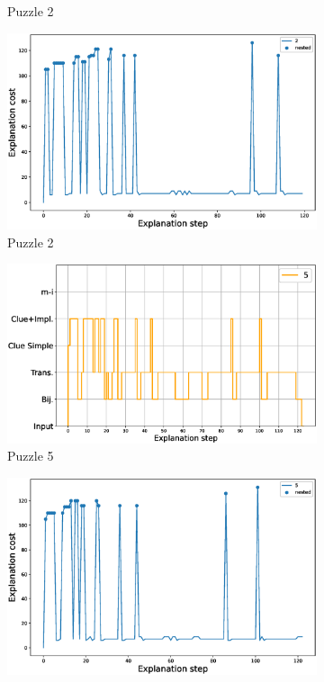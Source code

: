 \begin{figure}[t!]
\begin{subfigure}{.5\textwidth}
		\caption{Puzzle 2}
		\label{fig:composition_puzzle:p2}
	\end{subfigure}%
	\begin{subfigure}{.5\textwidth}
		\centering
		\includegraphics[width=0.84\linewidth]{figures/2.eps}
		\caption{Puzzle 2}
		\label{fig:cost_puzzle:p2}
	\end{subfigure}
	\begin{subfigure}{.5\textwidth}
		\centering
		\includegraphics[width=0.9\linewidth]{figures/plot_cost_steps_5.eps}
		\caption{Puzzle 5}
		\label{fig:composition_puzzle:p5}
	\end{subfigure}%
	\begin{subfigure}{.5\textwidth}
		\centering
		\includegraphics[width=0.84\linewidth]{figures/5.eps}

\end{subfigure}
\end{figure}
